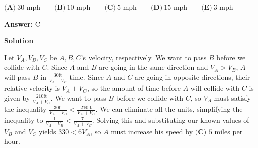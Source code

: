 \begin{enumerate}
 $\textbf{(A)}\ \text{30 mph}\qquad\textbf{(B)}\ \text{10 mph}\qquad\textbf{(C)}\ \text{5 mph}\qquad\textbf{(D)}\ \text{15 mph}\qquad\textbf{(E)}\ \text{3 mph}$

 \textbf{Answer: }C



\textbf{Solution}

Let $V_A, V_B, V_C$ be $A, B, C$'s velocity, respectively. We want to pass $B$ before we collide with $C$. Since $A$ and $B$ are going in the same direction and $V_A>V_B$, $A$ will pass $B$ in $\frac{30\mathrm{ft}}{V_A-V_B}$ time. Since $A$ and $C$ are going in opposite directions, their relative velocity is $V_A+V_C$, so the amount of time before $A$ will collide with $C$ is given by $\frac{210\mathrm{ft}}{V_A+V_C}$. We want to pass $B$ before we collide with $C$, so $V_A$ must satisfy the inequality $\frac{30\mathrm{ft}}{V_A-V_B}<\frac{210\mathrm{ft}}{V_A+V_C}$. We can eliminate all the units, simplifying the inequality to $\frac{1}{V_A-V_B} < \frac{7}{V_A+V_C}$. Solving this and substituting our known values of $V_B$ and $V_C$ yields $330<6V_A$, so $A$ must increase his speed by $\boxed{\textbf{(C) \ } 5 }$ miles per hour.

 


\end{enumerate}